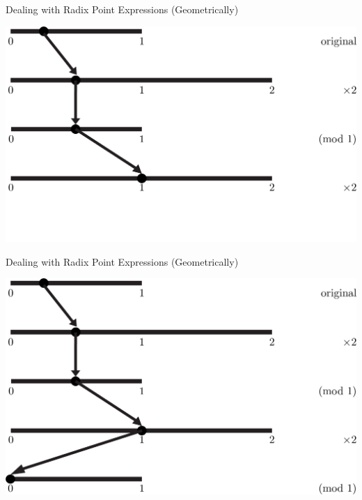 \documentclass{beamer}
\begin{document}
\begin{frame}{Dealing with Radix Point Expressions (Geometrically)}
  \addtocounter{framenumber}{-1}
  \begin{example}
    \includegraphics[width=\textwidth,height=0.75\textheight]{images/Binary/4}
  \end{example}
\end{frame}

\begin{frame}{Dealing with Radix Point Expressions (Geometrically)}
  \addtocounter{framenumber}{-1}
  \begin{example}
    \includegraphics[width=\textwidth,height=0.75\textheight]{images/Binary/5}
  \end{example}
\end{frame}
\end{document}
